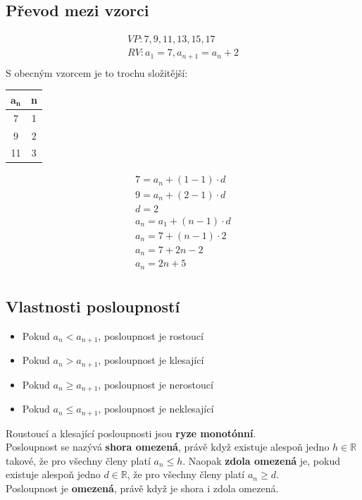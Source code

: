 \documentclass[12pt, a4paper]{article}
\begin{document}
\subsection*{Převod mezi vzorci}
\[
\begin{aligned}
	VP: 7,9,11,13,15,17\\
	RV: a_1 = 7, a_{n+1}=a_n+2\\
\end{aligned}
\]
S obecným vzorcem je to trochu složitější:\\
\begin{center}
\begin{tabular}{| c | c |}
$\mathbf{a_n}$ & \textbf{n}\\
\hline
7 & 1\\
9 & 2\\
11 & 3\\
\end{tabular}
\end{center}
\[
\begin{aligned}
	7 = a_n + (1-1)\cdot d\\
	9 = a_n + (2-1)\cdot d\\
	d = 2\\
	a_n = a_1 + (n-1) \cdot d\\
	a_n = 7 + (n-1)\cdot 2\\
	a_n = 7 + 2n - 2\\
	a_n = 2n + 5\\
\end{aligned}
\]
\subsection*{Vlastnosti posloupností}
\begin{itemize}
	\item Pokud $a_n < a_{n+1}$, posloupnost je rostoucí
	\item Pokud $a_n > a_{n+1}$, posloupnost je klesající
	\item Pokud $a_n \geq a_{n+1}$, posloupnost je nerostoucí
	\item Pokud $a_n \leq a_{n+1}$, posloupnost je neklesající
\end{itemize}
Roustoucí a klesající posloupnosti jsou \textbf{ryze monotónní}.\\
Posloupnost se nazývá \textbf{shora omezená}, právě když existuje alespoň jedno $h \in \mathbb{R}$ takové, že pro všechny členy platí $a_n \leq h$. Naopak \textbf{zdola omezená} je, pokud existuje alespoň jedno $d \in \mathbb{R}$, že pro všechny členy platí $a_n \geq d$.\\
Posloupnost je \textbf{omezená}, právě když je shora i zdola omezená.
\end{document}

